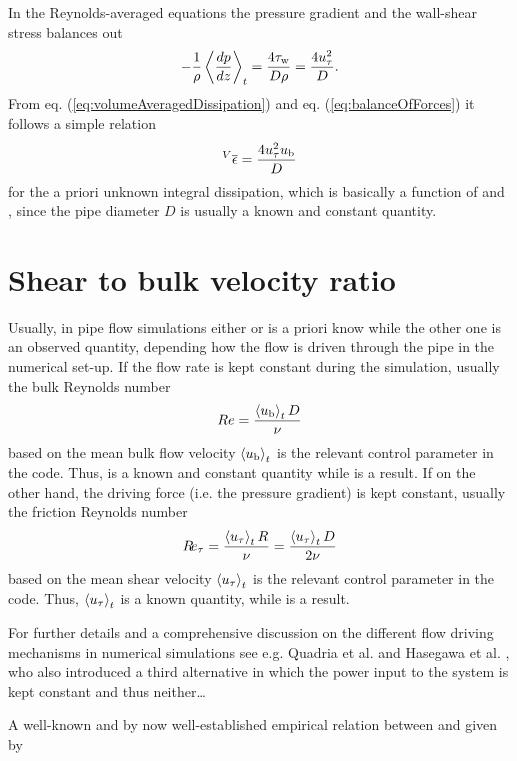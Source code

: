 \documentclass[a4paper, 11pt, twoside, DIV=12]{scrartcl}
\begin{document}
\par
In the Reynolds-averaged equations the pressure gradient and the wall-shear stress
\tauw balances out
\begin{align}
-\frac{1}{\rho}\left\langle\frac{d p}{dz}\right\rangle_{t} =
\frac{4\tau_{\text{w}}}{D\rho} =
\frac{4u_{\tau}^{2}}{D}\text{.}\label{eq:balanceOfForces}
\end{align}
From eq. (\ref{eq:volumeAveragedDissipation}) and eq. (\ref{eq:balanceOfForces})
it follows a simple relation
\begin{align}
\prescript{V}{}{\overline{\epsilon}} = \frac{4u_{\tau}^{2}u_{\text{b}}}{D}
\label{eq:dissipationVelocityRelation}
\end{align}
for the a priori unknown integral dissipation, which is basically a function of
\utau and \ubulk, since the pipe diameter $D$ is usually a known and constant
quantity.
%
%
%
\section{Shear to bulk velocity ratio}
Usually, in pipe flow simulations either \utau or \ubulk is a priori know while
the other one is an observed quantity, depending how the flow is driven through
the pipe in the numerical set-up. If the flow rate is kept constant during the
simulation, usually the bulk Reynolds number
\begin{align}
 Re=\frac{\left\langle u_{\text{b}}\right\rangle_{t}D}{\nu}
 \label{eq:bulkReynoldsNumber}
\end{align}
based on the mean bulk flow velocity $\left\langle u_{\text{b}}\right\rangle_{t}$ is the relevant
control parameter in the code. Thus, \ubulk is a known and constant quantity
while \utau is a result. If on the other hand, the driving force (i.e. the
pressure gradient) is kept constant, usually the friction Reynolds number
\begin{align}
 R\!e_{\tau}=\frac{\left\langle u_{\tau}\right\rangle_{t}R}{\nu}=\frac{\left\langle u_{\tau}\right\rangle_{t}D}{2\nu}
 \label{eq:shearReynoldsNumber}
\end{align}
based on the mean shear velocity $\left\langle u_{\tau}\right\rangle_{t}$ is the relevant control
parameter in the code. Thus, $\left\langle u_{\tau}\right\rangle_{t}$ is a known quantity, while
\ubulk is a result.
\par
For further details and a
comprehensive discussion on the different flow driving mechanisms in numerical
simulations see e.g. Quadria et al. \cite{Quadrio2016} and Hasegawa et al.
\cite{Hasegawa2014}, who also introduced a third alternative in which the power
input to the system is kept constant and thus neither\dots
\par
A well-known and by now well-established empirical relation between \ubulk and
\utau given by
\end{document}
